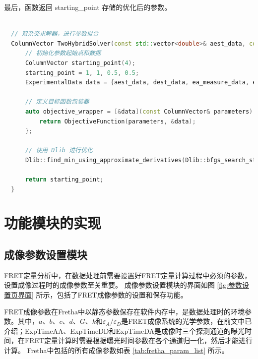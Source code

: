 最后，函数返回 {starting\_point} 存储的优化后的参数。
\begin{lstlisting}[language=C++, caption={双杂交求解器}, label={code:two_hybrid_solver}]
  
  // 双杂交求解器，进行参数拟合
  ColumnVector TwoHybridSolver(const std::vector<double>& aest_data, const std::vector<double>& dest_data, const std::vector<double>& ea_measure_data,const std::vector<double>& ed_measure_data) {
      // 初始化参数起始点和数据
      ColumnVector starting_point(4);
      starting_point = 1, 1, 0.5, 0.5;
      ExperimentalData data = {aest_data, dest_data, ea_measure_data, ed_measure_data};

      // 定义目标函数包装器
      auto objective_wrapper = [&data](const ColumnVector& parameters) {
          return ObjectiveFunction(parameters, &data);
      };
  
      // 使用 Dlib 进行优化
      Dlib::find_min_using_approximate_derivatives(Dlib::bfgs_search_strategy(), Dlib::objective_delta_stop_strategy(1e-7), objective_wrapper, starting_point, -1, 0.01);

      return starting_point;
  }
\end{lstlisting}  

\section{功能模块的实现}

\subsection{成像参数设置模块}
\ifshowtext
FRET定量分析中，在数据处理前需要设置好FRET定量计算过程中必须的参数，设置成像过程时的成像参数至关重要。
成像参数设置模块的界面如图 \ref{fig:参数设置页界面} 所示，包括了FRET成像参数的设置和保存功能。

FRET成像参数在Fretha中以静态参数保存在软件内存中，是数据处理时的环境参数。其中，$a$、$b$、$c$、$d$、$G$、$k$和$\varepsilon_{A}/\varepsilon_{D}$是FRET成像系统的光学参数，在前文中已介绍；ExpTimeAA、ExpTimeDD和ExpTimeDA是成像时三个探测通道的曝光时间，在FRET定量计算时需要根据曝光时间参数在各个通道归一化，然后才能进行计算。
Fretha中包括的所有成像参数如表 \ref{tab:fretha_param_list} 所示。

